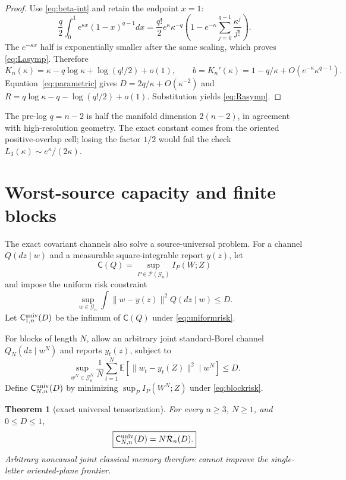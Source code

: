 \documentclass[11pt,a4paper]{article}
\newtheorem{theorem}{Theorem}[section]
\newcommand{\G}{\mathcal G}
\newcommand{\RDF}{\mathcal R}
\newcommand{\E}{\mathbb E}
\begin{document}
\begin{proof}
Use \cref{eq:beta-int} and retain the endpoint $x=1$:
\[
 \frac q2\int_0^1 e^{\kappa x}(1-x)^{q-1}dx
 =\frac{q!}{2}e^\kappa\kappa^{-q}
 \left(1-e^{-\kappa}\sum_{j=0}^{q-1}\frac{\kappa^j}{j!}\right).
\]
The $e^{-\kappa x}$ half is exponentially smaller after the same scaling, which proves \cref{eq:Lasymp}.  Therefore
\[
 K_n(\kappa)=\kappa-q\log\kappa+\log(q!/2)+o(1),
 \qquad b=K_n'(\kappa)=1-q/\kappa+O(e^{-\kappa}\kappa^{q-1}).
\]
Equation~\eqref{eq:parametric} gives $D=2q/\kappa+O(\kappa^{-2})$ and
$R=q\log\kappa-q-\log(q!/2)+o(1)$.  Substitution yields \cref{eq:Rasymp}.
\end{proof}

The pre-log $q=n-2$ is half the manifold dimension $2(n-2)$, in agreement with high-resolution geometry.  The exact constant comes from the oriented positive-overlap cell; losing the factor $1/2$ would fail the check $L_3(\kappa)\sim e^\kappa/(2\kappa)$.

\section{Worst-source capacity and finite blocks}

The exact covariant channels also solve a source-universal problem.  For a
channel $Q(dz\mid w)$ and a measurable square-integrable report $y(z)$, let
\[
 \mathsf C(Q)=\sup_{P\in\mathcal P(\G_n)}I_P(W;Z)
\]
and impose the uniform risk constraint
\begin{equation}\label{eq:uniformrisk}
 \sup_{w\in\G_n}\int\|w-y(z)\|^2Q(dz\mid w)\le D.
\end{equation}
Let $\mathsf C_{1,n}^{\rm univ}(D)$ be the infimum of $\mathsf C(Q)$ under
\cref{eq:uniformrisk}.

For blocks of length $N$, allow an arbitrary joint standard-Borel channel
$Q_N(dz\mid w^N)$ and reports $y_t(z)$, subject to
\begin{equation}\label{eq:blockrisk}
 \sup_{w^N\in\G_n^N}\frac1N\sum_{t=1}^N
 \E[\|w_t-y_t(Z)\|^2\mid w^N]\le D.
\end{equation}
Define $\mathsf C_{N,n}^{\rm univ}(D)$ by minimizing
$\sup_P I_P(W^N;Z)$ under \cref{eq:blockrisk}.

\begin{theorem}[exact universal tensorization]\label{thm:universal}
For every $n\ge3$, $N\ge1$, and $0\le D\le1$,
\begin{equation}\label{eq:universalidentity}
 \boxed{\mathsf C_{N,n}^{\rm univ}(D)=N\RDF_n(D).}
\end{equation}
Arbitrary noncausal joint classical memory therefore cannot improve the
single-letter oriented-plane frontier.
\end{theorem}
\end{document}
